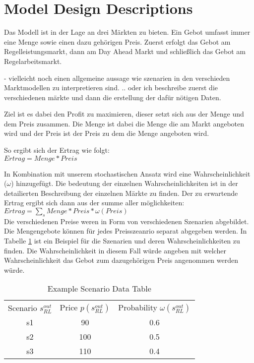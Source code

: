 


\section{Model Design Descriptions}
Das Modell ist in der Lage an drei Märkten zu bieten. Ein Gebot umfasst immer eine Menge sowie einen dazu gehörigen Preis. Zuerst erfolgt
das Gebot am Regelleistungsmarkt, dann am Day Ahead Markt und schließlich das Gebot am Regelarbeitsmarkt.

- vielleicht noch einen allgemeine aussage wie szenarien in den verschieden Marktmodellen zu interpretieren sind.
.. oder ich beschreibe zuerst die verschiedenen märkte und dann die erstellung der dafür nötigen Daten.


Ziel ist es dabei den Profit zu maximieren, dieser setzt sich aus der Menge und dem Preis zusammen.
Die Menge ist dabei die Menge die am Markt angeboten wird und der Preis ist der Preis zu dem die Menge angeboten wird.

So ergibt sich der Ertrag wie folgt:\\

$Ertrag = Menge * Preis$

In Kombination mit unserem stochastischen Ansatz wird eine Wahrscheinlichkeit ($\omega$) hinzugefügt. Die
bedeutung der einzelnen Wahrscheinlichkeiten ist in der detailierten Beschreibung der einzelnen Märkte zu finden.
Der zu erwartende Ertrag ergibt sich dann aus der summe aller möglichkeiten:\\
$Ertrag = \sum_s Menge * Preis * \omega(Preis)$\\

Die verschiedenen Preise weren in Form von verschiedenen Szenarien abgebildet. Die Mengengebote können
für jedes Preisszeanrio separat abgegeben werden. In Tabelle \ref{tab:example_scenario} ist ein Beispiel für die
Szenarien und deren Wahrscheinlichkeiten zu finden. Die Wahrscheinlichkeit in diesem Fall würde angeben mit welcher
Wahrscheinlichkeit das Gebot zum dazugehörigen Preis angenommen werden würde.\\

\begin{table}[H]
	\begin{tabular}{c|c|c}
		Scenario $s^{out}_{RL}$ & Price $p(s^{out}_{RL})$ & Probability $\omega(s^{out}_{RL})$ \\
		s1                      & 90                      & 0.6                                \\
		s2                      & 100                     & 0.5                                \\
		s3                      & 110                     & 0.4                                \\
	\end{tabular}\\
	\label{tab:example_scenario}
	\caption{Example Scenario Data Table}
\end{table}

